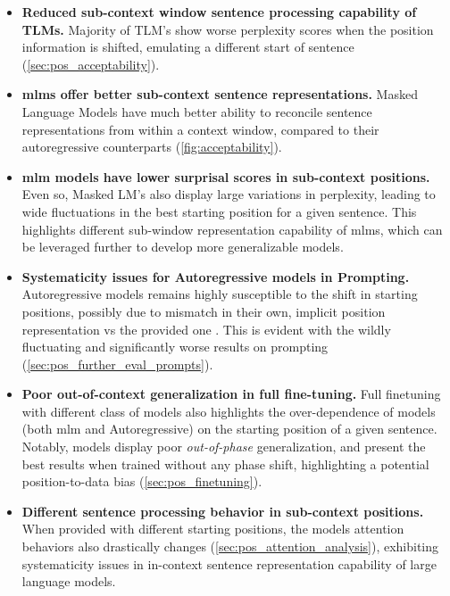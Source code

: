 \documentclass[letterpaper, 12pt]{report}
\begin{document}
\begin{itemize}
  \item \textbf{Reduced sub-context window sentence processing capability of TLMs.} Majority of TLM's show worse perplexity scores when the position information is shifted, emulating a different start of sentence (\autoref{sec:pos_acceptability}).
  \item \textbf{\acrshort{mlm}s offer better sub-context sentence representations.} Masked Language Models have much better ability to reconcile sentence representations from within a context window, compared to their autoregressive counterparts (\autoref{fig:acceptability}).
  \item \textbf{\acrshort{mlm} models have lower surprisal scores in sub-context positions.} Even so, Masked LM's also display large variations in perplexity, leading to wide fluctuations in the best starting position for a given sentence. This highlights different sub-window representation capability of \acrshort{mlm}s, which can be leveraged further to develop more generalizable models.
  \item \textbf{Systematicity issues for Autoregressive models in Prompting.} Autoregressive models remains highly susceptible to the shift in starting positions, possibly due to mismatch in their own, implicit position representation vs the provided one \citep{haviv2022}. This is evident with the wildly fluctuating and significantly worse results on prompting (\autoref{sec:pos_further_eval_prompts}).
  \item \textbf{Poor out-of-context generalization in full fine-tuning.} Full finetuning with different class of models also highlights the over-dependence of models (both \acrshort{mlm} and Autoregressive) on the starting position of a given sentence. Notably, models display poor \textit{out-of-phase} generalization, and present the best results when trained without any phase shift, highlighting a potential position-to-data bias (\autoref{sec:pos_finetuning}).
  \item \textbf{Different sentence processing behavior in sub-context positions.} When provided with different starting positions, the models attention behaviors also drastically changes (\autoref{sec:pos_attention_analysis}), exhibiting systematicity issues in in-context sentence representation capability of large language models.
\end{itemize}
\end{document}
